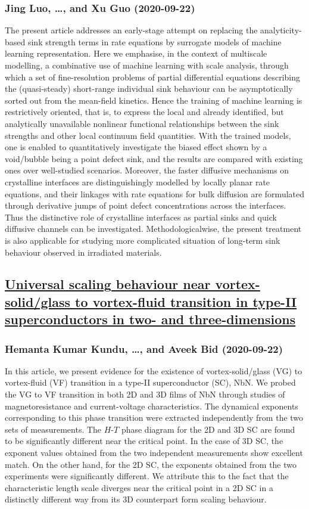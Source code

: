 {\subsubsection*{Jing Luo, \dots, and Xu Guo (2020-09-22)}
The present article addresses an early-stage attempt on replacing the
analyticity-based sink strength terms in rate equations by surrogate models of
machine learning representation. Here we emphasise, in the context of
multiscale modelling, a combinative use of machine learning with scale
analysis, through which a set of fine-resolution problems of partial
differential equations describing the (quasi-steady) short-range individual
sink behaviour can be asymptotically sorted out from the mean-field kinetics.
Hence the training of machine learning is restrictively oriented, that is, to
express the local and already identified, but analytically unavailable
nonlinear functional relationships between the sink strengths and other local
continuum field quantities. With the trained models, one is enabled to
quantitatively investigate the biased effect shown by a void/bubble being a
point defect sink, and the results are compared with existing ones over
well-studied scenarios. Moreover, the faster diffusive mechanisms on
crystalline interfaces are distinguishingly modelled by locally planar rate
equations, and their linkages with rate equations for bulk diffusion are
formulated through derivative jumps of point defect concentrations across the
interfaces. Thus the distinctive role of crystalline interfaces as partial
sinks and quick diffusive channels can be investigated. Methodologicalwise, the
present treatment is also applicable for studying more complicated situation of
long-term sink behaviour observed in irradiated materials.

\subsection*{\href{http://arxiv.org/abs/2009.10339v1}{Universal scaling behaviour near vortex-solid/glass to vortex-fluid  transition in type-II superconductors in two- and three-dimensions}}
\subsubsection*{Hemanta Kumar Kundu, \dots, and Aveek Bid (2020-09-22)}
In this article, we present evidence for the existence of vortex-solid/glass
(VG) to vortex-fluid (VF) transition in a type-II superconductor (SC), NbN. We
probed the VG to VF transition in both 2D and 3D films of NbN through studies
of magnetoresistance and current-voltage characteristics. The dynamical
exponents corresponding to this phase transition were extracted independently
from the two sets of measurements. The $H$-$T$ phase diagram for the 2D and 3D
SC are found to be significantly different near the critical point. In the case
of 3D SC, the exponent values obtained from the two independent measurements
show excellent match. On the other hand, for the 2D SC, the exponents obtained
from the two experiments were significantly different. We attribute this to the
fact that the characteristic length scale diverges near the critical point in a
2D SC in a distinctly different way from its 3D counterpart form scaling
behaviour.

}
